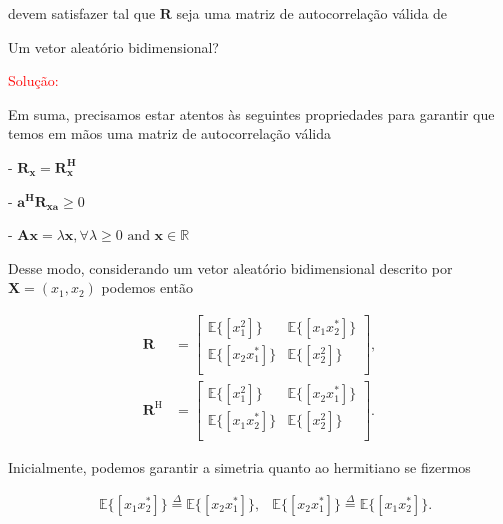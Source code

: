 devem satisfazer tal que $\mathbf{R}$ seja uma matriz de autocorrelação válida de


    
     Um vetor aleatório bidimensional?
    
        \textcolor{red}{Solução:}
        
        Em suma, precisamos estar atentos às seguintes propriedades para garantir que temos em mãos uma matriz de autocorrelação válida
        
        
        - $\mathbf{R_{x}} = \mathbf{R^{H}_{x}}$
        
        - $\mathbf{a^{H}} \mathbf{R_{xa}} \geq 0$
        
        - $\mathbf{Ax} = \lambda \mathbf{x}, \forall \lambda \geq 0 \text{ and } \mathbf{x} \in \mathbb{R}$
        
        Desse modo, considerando um vetor aleatório bidimensional descrito por $\mathbf{X} = (x_{1},x_{2})$ podemos então
        
        \begin{align}
            \mathbf{R} &= \left[ 
            \begin{matrix}
                \mathbb{E}\{[x^{2}_{1}]\} & \mathbb{E}\{[x_{1}x^{*}_{2}]\} \\
                \mathbb{E}\{[x_{2}x^{*}_{1}]\} & \mathbb{E}\{[x^{2}_{2}]\} \\
            \end{matrix} \right], \\
            \mathbf{R}^{\text{H}} &= \left[ 
            \begin{matrix}
                \mathbb{E}\{[x^{2}_{1}]\} & \mathbb{E}\{[x_{2}x^{*}_{1}]\} \\
                \mathbb{E}\{[x_{1}x^{*}_{2}]\} & \mathbb{E}\{[x^{2}_{2}]\} \\
            \end{matrix} \right].
        \end{align}
        
        Inicialmente, podemos garantir a simetria quanto ao hermitiano se fizermos 
        
        \begin{align}
            &\mathbb{E}\{[x_{1}x^{*}_{2}]\} \overset{\Delta}{=} \mathbb{E}\{[x_{2}x^{*}_{1}]\},
            &\mathbb{E}\{[x_{2}x^{*}_{1}]\} \overset{\Delta}{=} \mathbb{E}\{[x_{1}x^{*}_{2}]\}.
        \end{align}
        
